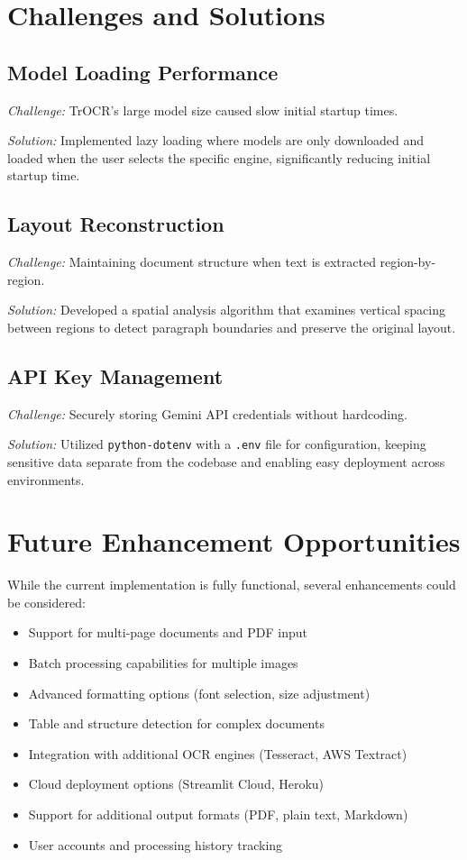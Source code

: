 \documentclass[12pt,a4paper]{article}
\begin{document}
\section{Challenges and Solutions}

\subsection{Model Loading Performance}
\textit{Challenge:} TrOCR's large model size caused slow initial startup times.

\textit{Solution:} Implemented lazy loading where models are only downloaded and loaded when the user selects the specific engine, significantly reducing initial startup time.

\subsection{Layout Reconstruction}
\textit{Challenge:} Maintaining document structure when text is extracted region-by-region.

\textit{Solution:} Developed a spatial analysis algorithm that examines vertical spacing between regions to detect paragraph boundaries and preserve the original layout.

\subsection{API Key Management}
\textit{Challenge:} Securely storing Gemini API credentials without hardcoding.

\textit{Solution:} Utilized \texttt{python-dotenv} with a \texttt{.env} file for configuration, keeping sensitive data separate from the codebase and enabling easy deployment across environments.

\section{Future Enhancement Opportunities}

While the current implementation is fully functional, several enhancements could be considered:

\begin{itemize}
    \item Support for multi-page documents and PDF input
    \item Batch processing capabilities for multiple images
    \item Advanced formatting options (font selection, size adjustment)
    \item Table and structure detection for complex documents
    \item Integration with additional OCR engines (Tesseract, AWS Textract)
    \item Cloud deployment options (Streamlit Cloud, Heroku)
    \item Support for additional output formats (PDF, plain text, Markdown)
    \item User accounts and processing history tracking
\end{itemize}
\end{document}

